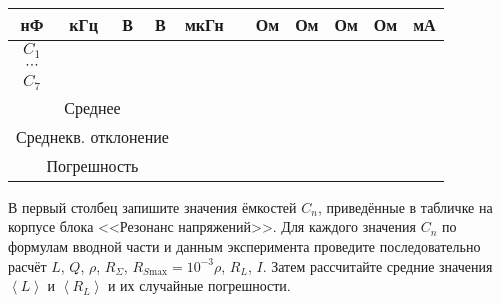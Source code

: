 \begin{lab:task}
\begin{tabular}{|c|c|c|c|c|c|c|c|c|c|c|}
		                    нФ & кГц & В & В & мкГн &  & Ом & Ом & Ом & Ом & мА
\\
		                    \hline
		                    $C_1$ & & & & & & & & & & \\
		                    \hline
		                    $\cdots$ &  & & &  &  &  &  & & & \\
		                    \hline
		                    $C_7$& & & & & & & & & & \\
		                    \hline
		                    \multicolumn{4}{|c|}{Среднее} & & & & & & & \\
		                    \hline
		                    \multicolumn{4}{|c|}{Среднекв. отклонение} & & & & & & & \\ \hline
		                    \multicolumn{4}{|c|}{Погрешность} & & & & & & & \\
		                    \hline
%
		                \end{tabular}


В первый столбец запишите значения ёмкостей $C_n$,
приведённые в табличке на корпусе блока <<Резонанс напряжений>>. Для каждого
значения $C_n$ по формулам вводной части и данным эксперимента проведите
последовательно расчёт $L$, $Q$, $\rho$, $R_{\Sigma}$,
$R_{S\text{max}}=10^{-3}\rho$, $R_L$, $I$. Затем рассчитайте
средние значения $\left< L \right>$ и $\left< R_L \right>$ 
и их случайные погрешности.


\end{lab:task}
